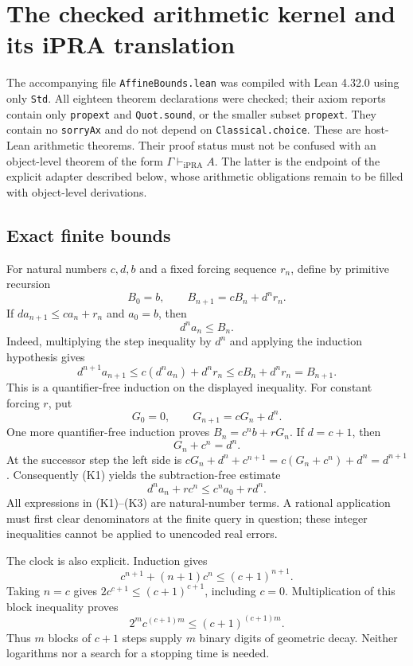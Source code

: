 \section{The checked arithmetic kernel and its iPRA translation}
\label{sec:checked-kernel}

The accompanying file \texttt{AffineBounds.lean} was compiled with Lean
4.32.0 using only \texttt{Std}.  All eighteen theorem declarations were
checked; their axiom reports contain only \texttt{propext} and
\texttt{Quot.sound}, or the smaller subset \texttt{propext}.  They contain
no \texttt{sorryAx} and do not depend on \texttt{Classical.choice}.
These are host-Lean arithmetic theorems.  Their proof status must not be
confused with an object-level theorem of the form
\(\Gamma\vdash_{\mathrm{iPRA}} A\).  The latter is the endpoint of the
explicit adapter described below, whose arithmetic obligations remain to
be filled with object-level derivations.

\subsection{Exact finite bounds}

For natural numbers \(c,d,b\) and a fixed forcing sequence \(r_n\), define
by primitive recursion
\[
 B_0=b,\qquad B_{n+1}=cB_n+d^n r_n.
\]
If \(d a_{n+1}\le c a_n+r_n\) and \(a_0=b\), then
\[
 d^n a_n\le B_n.                                      \tag{K1}
\]
Indeed, multiplying the step inequality by \(d^n\) and applying the
induction hypothesis gives
\[
 d^{n+1}a_{n+1}\le c(d^na_n)+d^n r_n
                 \le cB_n+d^nr_n=B_{n+1}.
\]
This is a quantifier-free induction on the displayed inequality.
For constant forcing \(r\), put
\[
 G_0=0,\qquad G_{n+1}=cG_n+d^n.
\]
One more quantifier-free induction proves
\(B_n=c^nb+rG_n\).  If \(d=c+1\), then
\[
 G_n+c^n=d^n.                                         \tag{K2}
\]
At the successor step the left side is
\(cG_n+d^n+c^{n+1}=c(G_n+c^n)+d^n=d^{n+1}\).
Consequently (K1) yields the subtraction-free estimate
\[
 d^na_n+rc^n\le c^na_0+rd^n.                          \tag{K3}
\]
All expressions in (K1)--(K3) are natural-number terms.  A rational
application must first clear denominators at the finite query in question;
these integer inequalities cannot be applied to unencoded real errors.

The clock is also explicit.  Induction gives
\[
 c^{n+1}+(n+1)c^n\le(c+1)^{n+1}.
\]
Taking \(n=c\) gives \(2c^{c+1}\le(c+1)^{c+1}\), including
\(c=0\). Multiplication of this block inequality proves
\[
 2^m c^{(c+1)m}\le(c+1)^{(c+1)m}.                     \tag{K4}
\]
Thus \(m\) blocks of \(c+1\) steps supply \(m\) binary digits of
geometric decay.  Neither logarithms nor a search for a stopping time is
needed.

